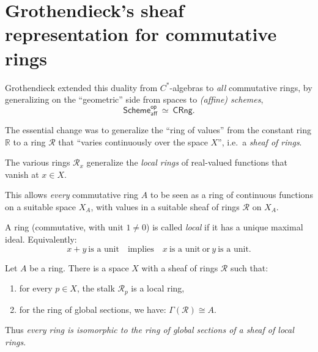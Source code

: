 \documentclass[lambek.tex]{subfiles}
\begin{document}
\section{Grothendieck's sheaf representation for commutative rings}

Grothendieck extended this duality from $C^*$-algebras to \emph{all} commutative rings, by generalizing on the ``geometric'' side from spaces to \emph{(affine) schemes},
 \[
\mathsf{Scheme}_\mathsf{aff}^\mathsf{op}\ \simeq\ \mathsf{CRng}.
 \]

The essential change was to generalize the ``ring of values'' from the constant ring $\mathbb{R}$ to a ring $\mathcal{R}$ that ``varies continuously over the space $X$'', i.e.\ a \emph{sheaf of rings}.   
\medskip

The various rings $\mathcal{R}_x$ generalize the \emph{local rings} of real-valued functions that vanish at $x\in X$.
\medskip

This allows \emph{every} commutative ring $A$ to be seen as a ring of continuous functions on a suitable space $X_A$, with values in a suitable sheaf of rings $\mathcal{R}$ on $X_A$.


\begin{definition} A  ring (commutative, with unit $1\neq 0$) is called \emph{local} if it has a unique maximal ideal.
Equivalently: $$x+y\ \text{is a unit}\quad\text{implies}\quad x\ \text{is a unit}\ \text{or}\ y\ \text{is a unit}.$$
\end{definition}
%
\begin{theorem}[Grothendieck]
Let $A$ be a ring.  There is a space $X$ with a sheaf of rings $\mathcal{R}$ such that:
\begin{enumerate}
\item for every $p\in X$, the stalk $\mathcal{R}_p$ is a local ring, 
\item for the ring of global sections, we have: $\Gamma(\mathcal{R}) \cong A$.
\end{enumerate}
Thus \emph{every ring is isomorphic to the ring of global sections of a sheaf of local rings}.
\end{theorem}
\end{document}
